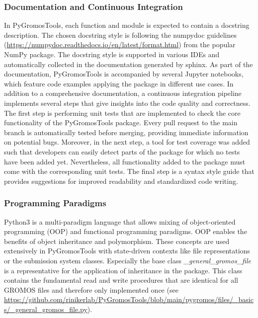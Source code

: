 \subsubsection{Documentation and Continuous Integration}
In PyGromosTools, each function and module is expected to contain a docstring description. The chosen docstring style is following the numpydoc guidelines (\url{https://numpydoc.readthedocs.io/en/latest/format.html}) from the popular NumPy package.\cite{Vanderwalt2011} The docstring style is supported in various IDEs and automatically collected in the documentation generated by sphinx\cite{brandl2021}. As part of the documentation, PyGromosTools is accompanied by several Jupyter notebooks, which feature code examples applying the package in different use cases.\cite{Kluyver2016}
In addition to a comprehensive documentation, a continuous integration pipeline implements several steps that give insights into the code quality and correctness. The first step is performing unit tests that are implemented to check the core functionality of the PyGromosTools package. Every pull request to the main branch is automatically tested before merging, providing immediate information on potential bugs. Moreover, in the next step, a tool for test coverage was added such that developers can easily detect parts of the package for which no tests have been added yet. Nevertheless, all functionality added to the package must come with the corresponding unit tests. The final step is a syntax style guide that provides suggestions for improved readability and standardized code writing.

\subsubsection{Programming Paradigms}
Python3 is a multi-paradigm language that allows mixing of object-oriented programming (OOP)\cite{Kay1993} and functional programming paradigms. 
OOP enables the benefits of object inheritance and polymorphism.\cite{Ganney2020} These concepts are used extensively in PyGromosTools with state-driven contexts like file representations or the submission system classes. Especially the base class \textit{\_general\_gromos\_file} is a representative for the application of inheritance in the package. This class contains the fundamental read and write procedures that are identical for all GROMOS files and therefore only implemented once (see \url{https://github.com/rinikerlab/PyGromosTools/blob/main/pygromos/files/_basics/_general_gromos_file.py}).

